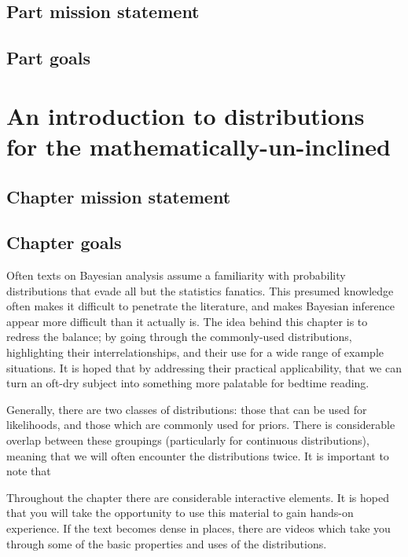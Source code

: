 \documentclass[11pt,fullpage]{book}
\begin{document}
\section{Part mission statement}
\section{Part goals}

\chapter{An introduction to distributions for the mathematically-un-inclined}\label{chap:distributions}
\section{Chapter mission statement}
\section{Chapter goals}
Often texts on Bayesian analysis assume a familiarity with probability distributions that evade all but the statistics fanatics. This presumed knowledge often makes it difficult to penetrate the literature, and makes Bayesian inference appear more difficult than it actually is. The idea behind this chapter is to redress the balance; by going through the commonly-used distributions, highlighting their interrelationships, and their use for a wide range of example situations. It is hoped that by addressing their practical applicability, that we can turn an oft-dry subject into something more palatable for bedtime reading.

Generally, there are two classes of distributions: those that can be used for likelihoods, and those which are commonly used for priors. There is considerable overlap between these groupings (particularly for continuous distributions), meaning that we will often encounter the distributions twice. It is important to note that  

Throughout the chapter there are considerable interactive elements. It is hoped that you will take the opportunity to use this material to gain hands-on experience. If the text becomes dense in places, there are videos which take you through some of the basic properties and uses of the distributions. 
\end{document}
